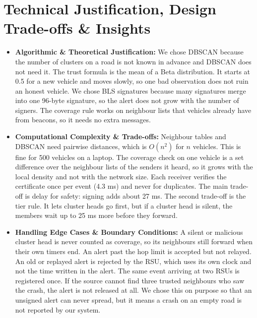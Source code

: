 \documentclass[11pt, a4paper]{article}
\begin{document}
\section{Technical Justification, Design Trade-offs \& Insights}
\begin{itemize}[noitemsep, topsep=2pt]
    \item \textbf{Algorithmic \& Theoretical Justification:} We chose DBSCAN because the number of clusters on a road is not known in advance and DBSCAN does not need it. The trust formula is the mean of a Beta distribution. It starts at 0.5 for a new vehicle and moves slowly, so one bad observation does not ruin an honest vehicle. We chose BLS signatures because many signatures merge into one 96-byte signature, so the alert does not grow with the number of signers. The coverage rule works on neighbour lists that vehicles already have from beacons, so it needs no extra messages.
    \item \textbf{Computational Complexity \& Trade-offs:} Neighbour tables and DBSCAN need pairwise distances, which is $O(n^2)$ for $n$ vehicles. This is fine for 500 vehicles on a laptop. The coverage check on one vehicle is a set difference over the neighbour lists of the senders it heard, so it grows with the local density and not with the network size. Each receiver verifies the certificate once per event (4.3 ms) and never for duplicates. The main trade-off is delay for safety: signing adds about 27 ms. The second trade-off is the tier rule. It lets cluster heads go first, but if a cluster head is silent, the members wait up to 25 ms more before they forward.
    \item \textbf{Handling Edge Cases \& Boundary Conditions:} A silent or malicious cluster head is never counted as coverage, so its neighbours still forward when their own timers end. An alert past the hop limit is accepted but not relayed. An old or replayed alert is rejected by the RSU, which uses its own clock and not the time written in the alert. The same event arriving at two RSUs is registered once. If the source cannot find three trusted neighbours who saw the crash, the alert is not released at all. We chose this on purpose so that an unsigned alert can never spread, but it means a crash on an empty road is not reported by our system.
\end{itemize}

\end{document}
